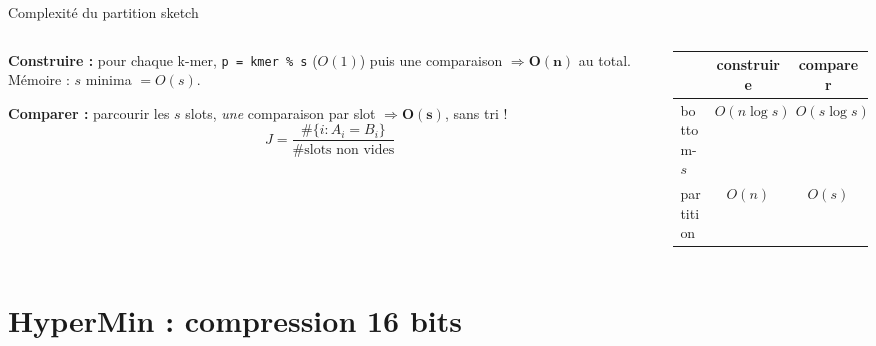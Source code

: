 \documentclass[aspectratio=169,11pt]{beamer}
\begin{document}
\begin{frame}{Complexité du partition sketch}
  \begin{columns}[T]
    \begin{column}{0.5\textwidth}
      \footnotesize
      \textbf{Construire :} pour chaque k-mer, \texttt{p = kmer \% s} ($O(1)$) puis une
      comparaison $\Rightarrow \mathbf{O(n)}$ au total. Mémoire : $s$ minima $= O(s)$.
      \medskip

      \textbf{Comparer :} parcourir les $s$ slots, \emph{une} comparaison par slot
      $\Rightarrow \mathbf{O(s)}$, \textcolor{cGreen}{sans tri !}
      \[ \hat J = \frac{\#\{i : A_i = B_i\}}{\#\text{slots non vides}} \]
    \end{column}
    \begin{column}{0.5\textwidth}
      \centering

      \smallskip
      {\scriptsize
      \begin{tabular}{lcc}
        \toprule
         & construire & comparer \\
        \midrule
        bottom-$s$ & $O(n\log s)$ & $O(s\log s)$ \\
        partition  & $O(n)$       & $O(s)$ \\
        \bottomrule
      \end{tabular}}
    \end{column}
  \end{columns}
\end{frame}

\section{HyperMin : compression 16 bits}
\end{document}
